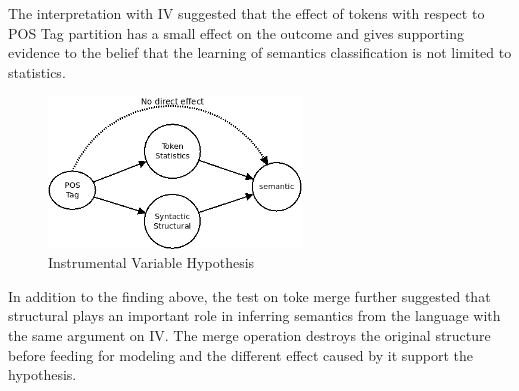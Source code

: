 \documentclass[12pt]{article}
\begin{document}
The interpretation with IV suggested that the effect of tokens with respect to POS Tag partition has a small effect on the outcome and gives supporting evidence to the belief that the learning of semantics classification is not limited to statistics. 
\begin{figure} [!h]
\begin{center}
\includegraphics[width=0.6\textwidth]{figures/combin_IV.png}
\caption{Instrumental Variable Hypothesis}
\label{fig:combinIV}
\end{center}
\end{figure}

In addition to the finding above, the test on toke merge further suggested that structural plays an important role in inferring semantics from the language with the same argument on IV. The merge operation destroys the original structure before feeding for modeling and the different effect caused by it support the hypothesis. 
\end{document}

